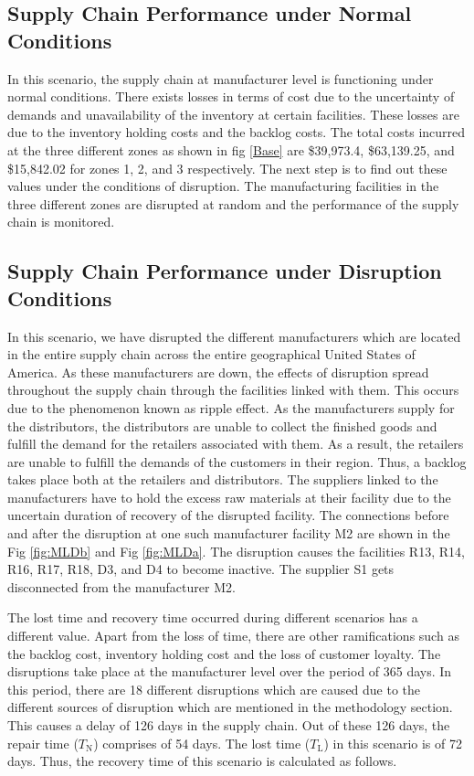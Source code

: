  \subsection{Supply Chain Performance under Normal Conditions}
In this scenario, the supply chain at manufacturer level is functioning under normal conditions. There exists losses in terms of cost due to the uncertainty of demands and unavailability of the inventory at certain facilities. These losses are due to the inventory holding costs and the backlog costs. The total costs incurred at the three different zones as shown in fig \ref{Base} are \$39,973.4, \$63,139.25, and \$15,842.02 for zones 1, 2, and 3 respectively. The next step is to find out these values under the conditions of disruption. The manufacturing facilities in the three different zones are disrupted at random and the performance of the supply chain is monitored.

 \subsection{Supply Chain Performance under Disruption Conditions}

In this scenario, we have disrupted the different manufacturers which are located in the entire supply chain across the entire geographical United States of America. As these manufacturers are down, the effects of disruption spread throughout the supply chain through the facilities linked with them. This occurs due to the phenomenon known as ripple effect. As the manufacturers supply for the distributors, the distributors are unable to collect the finished goods and fulfill the demand for the retailers associated with them. As a result, the retailers are unable to fulfill the demands of the customers in their region. Thus, a backlog takes place both at the retailers and distributors. The suppliers linked to the manufacturers have to hold the excess raw materials at their facility due to the uncertain duration of recovery of the disrupted facility. The connections before and after the disruption at one such manufacturer facility M2 are shown in the Fig \ref{fig:MLDb} and Fig \ref{fig:MLDa}. The disruption causes the facilities R13, R14, R16, R17, R18, D3, and D4 to become inactive. The supplier S1 gets disconnected from the manufacturer M2.

The lost time and recovery time occurred during different scenarios has a different value. Apart from the loss of time, there are other ramifications such as the backlog cost, inventory holding cost and the loss of customer loyalty. The disruptions take place at the manufacturer level over the period of 365 days. In this period, there are 18 different disruptions which are caused due to the different sources of disruption which are mentioned in the methodology section. This causes a delay of 126 days in the supply chain. Out of these 126 days, the repair time ($T_{\text{N}}$) comprises of 54 days. The lost time ($T_{\text{L}}$) in this scenario is of 72 days. Thus, the recovery time of this scenario is calculated as follows.

